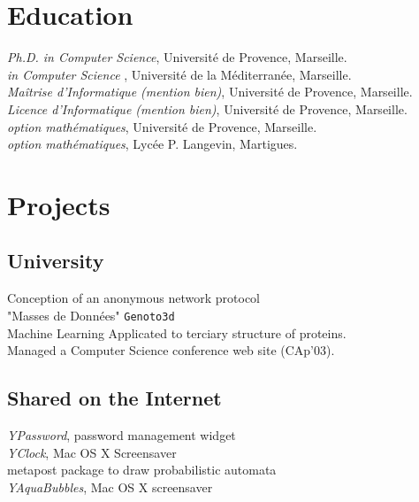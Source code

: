 \section*{Education}

\noindent{}\emph{Ph.D. in Computer Science}, Université de Provence, Marseille.\\
\noindent{}\emph{ in Computer Science} , Université de la Méditerranée, Marseille.\\
\noindent{}\emph{Maîtrise d'Informatique {\footnotesize(mention bien)}}, Université de Provence, Marseille.\\
\noindent{}\emph{Licence d'Informatique {\footnotesize(mention bien)}}, Université de Provence, Marseille.\\
\noindent{}\emph{ {\footnotesize option mathématiques}}, Université de Provence, Marseille.\\
\noindent{}\emph{ {\footnotesize option mathématiques}}, Lycée P. Langevin, Martigues.

\section*{Projects}

\subsection*{University}

\noindent{}Conception of an anonymous network protocol\\
 "Masses de Données" \texttt{Genoto3d}\\
{\phantom{es}\footnotesize Machine Learning Applicated to terciary structure of proteins.}\\
Managed a Computer Science conference web site (CAp'03).

\subsection*{Shared on the Internet}

\noindent{}\emph{YPassword}, password management widget\\
\noindent{}\emph{YClock}, Mac OS X Screensaver\\
\noindent{}metapost package to draw probabilistic automata\\
\noindent{}\emph{YAquaBubbles}, Mac OS X screensaver

